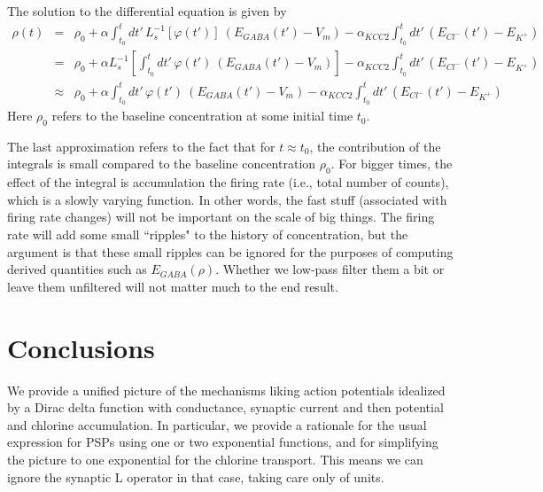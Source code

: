 \documentclass[11pt,oneside]{amsart}
\begin{document}
The solution to the differential equation is given by
\begin{eqnarray*}
    \rho(t) &=& \rho_0 +
    \alpha \int_{t_0}^t dt'\,  L_s^{-1}[\varphi(t')] \ (E_{GABA}(t') - V_m) - \alpha_{KCC2} \int_{t_0}^t dt'\, \left( E_{Cl^-}(t') -  E_{K^+} \right)\\
    &=& \rho_0 +
    \alpha L_s^{-1}\left[\int_{t_0}^t dt'\,  \varphi(t') \ (E_{GABA}(t') - V_m) \right]- \alpha_{KCC2} \int_{t_0}^t dt'\, \left( E_{Cl^-}(t') -  E_{K^+} \right) \\
 &\approx&     \rho_0 +
    \alpha \int_{t_0}^t dt'\,  \varphi(t') \ (E_{GABA}(t') - V_m) - \alpha_{KCC2} \int_{t_0}^t dt'\, \left( E_{Cl^-}(t') -  E_{K^+} \right)
\end{eqnarray*}
Here $\rho_0$ refers to the baseline concentration at some initial time $t_0$. 

The last approximation refers to the fact that for $t \approx t_0$, the contribution of the integrals is small compared to the baseline concentration $\rho_0$. For bigger times, the effect of the integral is accumulation  the firing rate (i.e., total number of counts), which is a slowly varying function. In other words, the fast stuff (associated with firing rate changes) will not be important on the scale of big things. The firing rate will add some small ``ripples" to the history of concentration, but the argument is that these small ripples can be ignored for the purposes of computing derived quantities such as $E_{GABA}(\rho)$. Whether we low-pass filter them a bit or leave them unfiltered will not matter much to the end result.



\section{Conclusions}
 We provide a unified picture of the mechanisms liking action potentials idealized by a Dirac delta function with conductance, synaptic current and then potential and chlorine accumulation. In particular, we provide a rationale for the usual expression for PSPs using one or two exponential functions, and for simplifying the picture to one exponential for the chlorine transport. This means we can ignore the synaptic L operator in that case, taking care only of units.
 

 
\printbibliography
\end{document}
